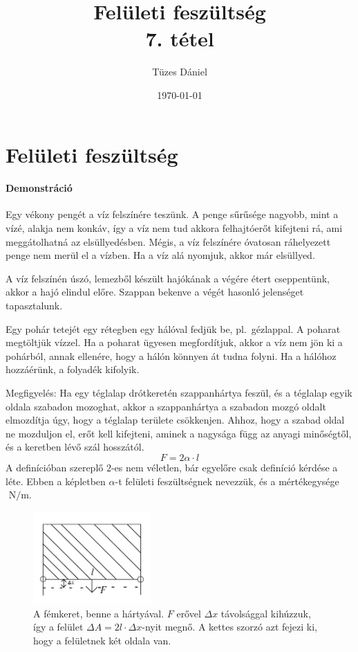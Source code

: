 \documentclass[12pt,a4paper]{scrartcl}
\title{Felületi feszültség\\{\small{7. tétel}}}
\author{Tüzes Dániel}
\date{\today}
\begin{document}
\maketitle

\section{Felületi feszültség}

\footnotesize
\paragraph{Demonstráció} Egy vékony pengét a víz felszínére teszünk. A penge sűrűsége nagyobb, mint a vízé, alakja nem konkáv, így a víz nem tud akkora felhajtóerőt kifejteni rá, ami meggátolhatná az elsüllyedésben. Mégis, a víz felszínére óvatosan ráhelyezett penge nem merül el a vízben. Ha a víz alá nyomjuk, akkor már elsüllyed.

A víz felszínén úszó, lemezből készült hajókának a végére étert cseppentünk, akkor a hajó elindul előre. Szappan bekenve a végét hasonló jelenséget tapasztalunk.

Egy pohár tetejét egy rétegben egy hálóval fedjük be, pl.\ gézlappal. A poharat megtöltjük vízzel. Ha a poharat ügyesen megfordítjuk, akkor a víz nem jön ki a pohárból, annak ellenére, hogy a hálón könnyen át tudna folyni. Ha a hálóhoz hozzáérünk, a folyadék kifolyik.
\normalsize

Megfigyelés: Ha egy téglalap drótkeretén szappanhártya feszül, és a téglalap egyik oldala szabadon mozoghat, akkor a szappanhártya a szabadon mozgó oldalt elmozdítja úgy, hogy a téglalap területe csökkenjen. Ahhoz, hogy a szabad oldal ne mozduljon el, erőt kell kifejteni, aminek a nagysága függ az anyagi minőségtől, és a keretben lévő szál hosszától.
\[F = 2\alpha  \cdot l\]
A definícióban szereplő $2$-es nem véletlen, bár egyelőre csak definíció kérdése a léte. Ebben a képletben $\alpha$-t felületi feszültségnek nevezzük, és a  mértékegysége $\text{ N}/\text{m}$.

\begin{figure}[htbp]
	\begin{center}
		\includegraphics[width=0.4\textwidth]{tetel7.png}
		\caption{A fémkeret, benne a hártyával. $F$ erővel $\Delta x$ távolsággal kihúzzuk, így a felület $\Delta A =  2l \cdot \Delta x$-nyit megnő. A kettes szorzó azt fejezi ki, hogy a felületnek két oldala van.}
	\end{center}
\end{figure}
\end{document}
